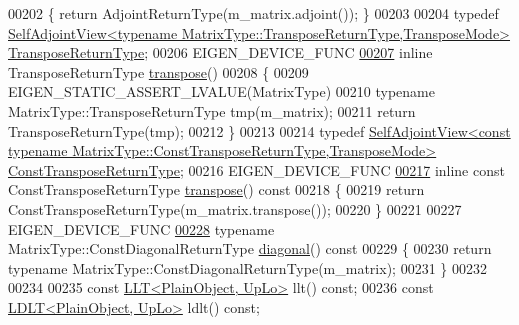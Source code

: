\begin{DoxyCode}
00202 \textcolor{keyword}{    }\{ \textcolor{keywordflow}{return} AdjointReturnType(m\_matrix.adjoint()); \}
00203 
00204     \textcolor{keyword}{typedef} 
      \hyperlink{group___core___module_class_eigen_1_1_self_adjoint_view}{SelfAdjointView<typename MatrixType::TransposeReturnType,TransposeMode>}
       \hyperlink{group___core___module_class_eigen_1_1_self_adjoint_view}{TransposeReturnType};
00206     EIGEN\_DEVICE\_FUNC
\hyperlink{group___core___module_abdff2b280dd18dfbe1ca99338b381870}{00207}     \textcolor{keyword}{inline} TransposeReturnType \hyperlink{group___core___module_abdff2b280dd18dfbe1ca99338b381870}{transpose}()
00208     \{
00209       EIGEN\_STATIC\_ASSERT\_LVALUE(MatrixType)
00210       \textcolor{keyword}{typename} MatrixType::TransposeReturnType tmp(m\_matrix);
00211       \textcolor{keywordflow}{return} TransposeReturnType(tmp);
00212     \}
00213 
00214     \textcolor{keyword}{typedef} 
      \hyperlink{group___core___module_class_eigen_1_1_self_adjoint_view}{SelfAdjointView<const typename MatrixType::ConstTransposeReturnType,TransposeMode>}
       \hyperlink{group___core___module_class_eigen_1_1_self_adjoint_view}{ConstTransposeReturnType};
00216     EIGEN\_DEVICE\_FUNC
\hyperlink{group___core___module_aa1304047233ca6b8c9ee87c025edccc9}{00217}     \textcolor{keyword}{inline} \textcolor{keyword}{const} ConstTransposeReturnType \hyperlink{group___core___module_aa1304047233ca6b8c9ee87c025edccc9}{transpose}()\textcolor{keyword}{ const}
00218 \textcolor{keyword}{    }\{
00219       \textcolor{keywordflow}{return} ConstTransposeReturnType(m\_matrix.transpose());
00220     \}
00221 
00227     EIGEN\_DEVICE\_FUNC
\hyperlink{group___core___module_abe2f0e6cbade78463ff973178947db98}{00228}     \textcolor{keyword}{typename} MatrixType::ConstDiagonalReturnType \hyperlink{group___core___module_abe2f0e6cbade78463ff973178947db98}{diagonal}()\textcolor{keyword}{ const}
00229 \textcolor{keyword}{    }\{
00230       \textcolor{keywordflow}{return} \textcolor{keyword}{typename} MatrixType::ConstDiagonalReturnType(m\_matrix);
00231     \}
00232 
00234 
00235     \textcolor{keyword}{const} \hyperlink{group___cholesky___module_class_eigen_1_1_l_l_t}{LLT<PlainObject, UpLo>} llt() \textcolor{keyword}{const};
00236     \textcolor{keyword}{const} \hyperlink{group___cholesky___module_class_eigen_1_1_l_d_l_t}{LDLT<PlainObject, UpLo>} ldlt() \textcolor{keyword}{const};

\end{DoxyCode}
